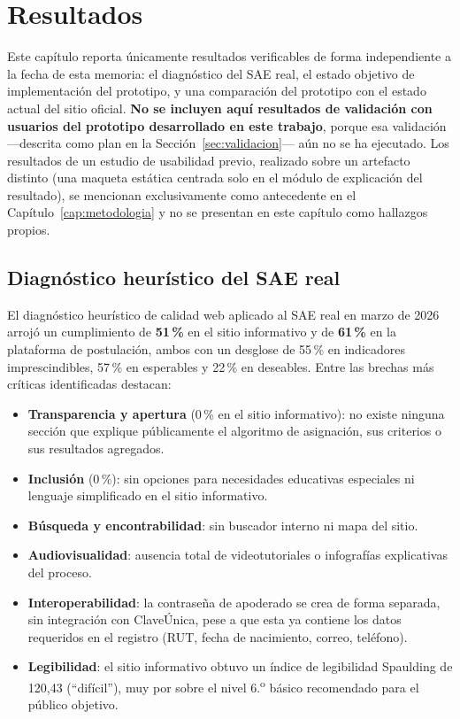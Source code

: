 \chapter{Resultados}\label{cap:resultados}

Este capítulo reporta únicamente resultados verificables de forma independiente a la fecha de esta memoria: el diagnóstico del SAE real, el estado objetivo de implementación del prototipo, y una comparación del prototipo con el estado actual del sitio oficial. \textbf{No se incluyen aquí resultados de validación con usuarios del prototipo desarrollado en este trabajo}, porque esa validación —descrita como plan en la Sección~\ref{sec:validacion}— aún no se ha ejecutado. Los resultados de un estudio de usabilidad previo, realizado sobre un artefacto distinto (una maqueta estática centrada solo en el módulo de explicación del resultado), se mencionan exclusivamente como antecedente en el Capítulo~\ref{cap:metodologia} y no se presentan en este capítulo como hallazgos propios.

\section{Diagnóstico heurístico del SAE real}\label{sec:res-diagnostico}

El diagnóstico heurístico de calidad web aplicado al SAE real en marzo de 2026 arrojó un cumplimiento de \textbf{51\,\%} en el sitio informativo y de \textbf{61\,\%} en la plataforma de postulación, ambos con un desglose de 55\,\% en indicadores imprescindibles, 57\,\% en esperables y 22\,\% en deseables. Entre las brechas más críticas identificadas destacan:

\begin{itemize}
    \item \textbf{Transparencia y apertura} (0\,\% en el sitio informativo): no existe ninguna sección que explique públicamente el algoritmo de asignación, sus criterios o sus resultados agregados.
    \item \textbf{Inclusión} (0\,\%): sin opciones para necesidades educativas especiales ni lenguaje simplificado en el sitio informativo.
    \item \textbf{Búsqueda y encontrabilidad}: sin buscador interno ni mapa del sitio.
    \item \textbf{Audiovisualidad}: ausencia total de videotutoriales o infografías explicativas del proceso.
    \item \textbf{Interoperabilidad}: la contraseña de apoderado se crea de forma separada, sin integración con ClaveÚnica, pese a que esta ya contiene los datos requeridos en el registro (RUT, fecha de nacimiento, correo, teléfono).
    \item \textbf{Legibilidad}: el sitio informativo obtuvo un índice de legibilidad Spaulding de 120{,}43 (``difícil''), muy por sobre el nivel 6.\textsuperscript{o} básico recomendado para el público objetivo.
\end{itemize}

